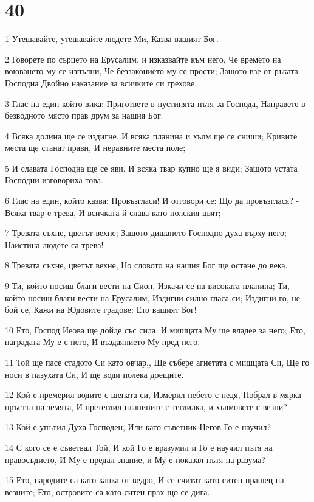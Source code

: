 \chapter{40}

\par 1 Утешавайте, утешавайте людете Ми, Казва вашият Бог.
\par 2 Говорете по сърцето на Ерусалим, и изказвайте към него, Че времето на воюването му се изпълни, Че беззаконието му се прости; Защото взе от ръката Господна Двойно наказание за всичките си грехове.
\par 3 Глас на един който вика: Пригответе в пустинята пътя за Господа, Направете в безводното място прав друм за нашия Бог.
\par 4 Всяка долина ще се издигне, И всяка планина и хълм ще се сниши; Кривите места ще станат прави, И неравните места поле;
\par 5 И славата Господна ще се яви, И всяка твар купно ще я види; Защото устата Господни изговориха това.
\par 6 Глас на един, който казва: Провъзгласи! И отговори се: Що да провъзглася? - Всяка твар е трева, И всичката й слава като полския цвят;
\par 7 Тревата съхне, цветът вехне; Защото дишането Господно духа върху него; Наистина людете са трева!
\par 8 Тревата съхне, цветът вехне, Но словото на нашия Бог ще остане до века.
\par 9 Ти, който носиш благи вести на Сион, Изкачи се на високата планина; Ти, който носиш благи вести на Ерусалим, Издигни силно гласа си; Издигни го, не бой се, Кажи на Юдовите градове: Ето вашият Бог!
\par 10 Ето, Господ Иеова ще дойде със сила, И мишцата Му ще владее за него; Ето, наградата Му е с него, И въздаянието Му пред него.
\par 11 Той ще пасе стадото Си като овчар,, Ще събере агнетата с мишцата Си, Ще го носи в пазухата Си, И ще води полека доещите.
\par 12 Кой е премерил водите с шепата си, Измерил небето с педя, Побрал в мярка пръстта на земята, И претеглил планините с теглилка, и хълмовете с везни?
\par 13 Кой е упътил Духа Господен, Или като съветник Негов Го е научил?
\par 14 С кого се е съветвал Той, И кой Го е вразумил и Го е научил пътя на правосъдието, И Му е предал знание, и Му е показал пътя на разума?
\par 15 Ето, народите са като капка от ведро, И се считат като ситен прашец на везните; Ето, островите са като ситен прах що се дига.
